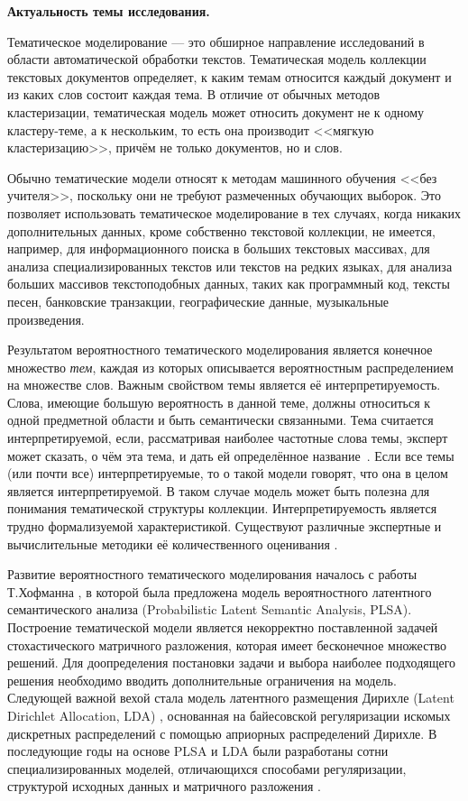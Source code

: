 

\textbf{Актуальность темы исследования.}

Тематическое моделирование --- это обширное направление исследований в области автоматической обработки текстов. Тематическая модель коллекции текстовых документов определяет, к каким темам относится каждый документ и из каких слов состоит каждая тема. В отличие от обычных методов кластеризации, тематическая модель может относить документ не к одному кластеру-теме, а к нескольким, то есть  она производит <<мягкую кластеризацию>>, причём не только документов, но и слов.

Обычно тематические модели относят к методам машинного обучения <<без учителя>>, поскольку они не требуют размеченных обучающих выборок. Это позволяет использовать тематическое моделирование в тех случаях, когда никаких дополнительных данных, кроме собственно текстовой коллекции, не имеется, например, для информационного поиска в больших текстовых массивах, для анализа специализированных текстов или текстов на редких языках, для анализа больших массивов текстоподобных данных, таких как программный код, тексты песен, банковские транзакции, географические данные, музыкальные произведения.

Результатом вероятностного тематического моделирования является конечное множество \textit{тем}, каждая из которых описывается вероятностным распределением на множестве слов. Важным свойством темы является её интерпретируемость. Слова, имеющие большую вероятность в данной теме, должны относиться к одной предметной области и быть семантически связанными. Тема считается интерпретируемой, если, рассматривая наиболее частотные слова темы, эксперт может сказать, о чём эта тема, и дать ей определённое название~\cite{rtl}. Если все темы (или почти все) интерпретируемые, то о такой модели говорят, что она в целом является интерпретируемой. В таком случае модель может быть полезна для понимания тематической структуры коллекции. Интерпретируемость является трудно формализуемой характеристикой. Существуют различные экспертные и вычислительные методики её количественного оценивания \cite{newman2010automatic}.

Развитие вероятностного тематического моделирования началось с работы Т.Хофманна \cite{hofmann1999}, в которой была предложена модель вероятностного латентного семантического анализа (Probabilistic Latent Semantic Analysis, PLSA). Построение тематической модели является некорректно поставленной задачей стохастического матричного разложения, которая имеет бесконечное множество решений. Для доопределения постановки задачи и выбора наиболее подходящего решения необходимо вводить дополнительные ограничения на модель. Следующей важной вехой стала модель латентного размещения Дирихле (Latent Dirichlet Allocation, LDA) \cite{blei2003latent}, основанная на байесовской регуляризации искомых дискретных распределений с помощью априорных распределений Дирихле. В последующие годы на основе PLSA и LDA были разработаны сотни специализированных моделей, отличающихся способами регуляризации, структурой исходных данных и матричного разложения \cite{daud10knowledge,blei2012,fntir2017applications}.

